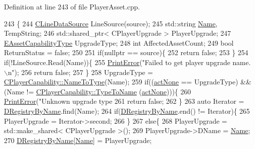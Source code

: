 Definition at line 243 of file Player\+Asset.\+cpp.


\begin{DoxyCode}
243                                                             \{
244     \hyperlink{classCLineDataSource}{CLineDataSource} LineSource(source);
245     std::string \hyperlink{classCPlayerUpgrade_a9030c62bc29150957f2fb6485ee9c01f}{Name}, TempString;
246     std::shared\_ptr< CPlayerUpgrade > PlayerUpgrade;
247     \hyperlink{GameDataTypes_8h_a35b98ce26aca678b03c6f9f76e4778ce}{EAssetCapabilityType} UpgradeType;
248     \textcolor{keywordtype}{int} AffectedAssetCount;
249     \textcolor{keywordtype}{bool} ReturnStatus = \textcolor{keyword}{false};
250     
251     \textcolor{keywordflow}{if}(\textcolor{keyword}{nullptr} == source)\{
252         \textcolor{keywordflow}{return} \textcolor{keyword}{false};   
253     \}
254     \textcolor{keywordflow}{if}(!LineSource.Read(Name))\{
255         \hyperlink{Debug_8h_a2ed825eefefe35baf59a93a8c641323d}{PrintError}(\textcolor{stringliteral}{"Failed to get player upgrade name.\(\backslash\)n"});
256         \textcolor{keywordflow}{return} \textcolor{keyword}{false};
257     \}
258     UpgradeType = \hyperlink{classCPlayerCapability_a920a696526e8a839f728192aea0ba1c5}{CPlayerCapability::NameToType}(Name);
259     \textcolor{keywordflow}{if}((\hyperlink{GameDataTypes_8h_a35b98ce26aca678b03c6f9f76e4778ceaa8df154ad276f6f62054e9b5b0696f92}{actNone} == UpgradeType) && (Name != \hyperlink{classCPlayerCapability_a976f05b7e620b721bdb5051debc9b93d}{CPlayerCapability::TypeToName}
      (\hyperlink{GameDataTypes_8h_a35b98ce26aca678b03c6f9f76e4778ceaa8df154ad276f6f62054e9b5b0696f92}{actNone})))\{
260         \hyperlink{Debug_8h_a2ed825eefefe35baf59a93a8c641323d}{PrintError}(\textcolor{stringliteral}{"Unknown upgrade type %
261         \textcolor{keywordflow}{return} \textcolor{keyword}{false};
262     \}
263     \textcolor{keyword}{auto} Iterator = \hyperlink{classCPlayerUpgrade_a33e022bd67ce2f4d9ce83dfd0b7289f6}{DRegistryByName}.find(Name);
264     \textcolor{keywordflow}{if}(\hyperlink{classCPlayerUpgrade_a33e022bd67ce2f4d9ce83dfd0b7289f6}{DRegistryByName}.end() != Iterator)\{
265         PlayerUpgrade = Iterator->second;
266     \}
267     \textcolor{keywordflow}{else}\{
268         PlayerUpgrade = std::make\_shared< CPlayerUpgrade >();
269         PlayerUpgrade->DName = \hyperlink{classCPlayerUpgrade_a9030c62bc29150957f2fb6485ee9c01f}{Name};
270         \hyperlink{classCPlayerUpgrade_a33e022bd67ce2f4d9ce83dfd0b7289f6}{DRegistryByName}[\hyperlink{classCPlayerUpgrade_a9030c62bc29150957f2fb6485ee9c01f}{Name}] = PlayerUpgrade;
}
\end{DoxyCode}
